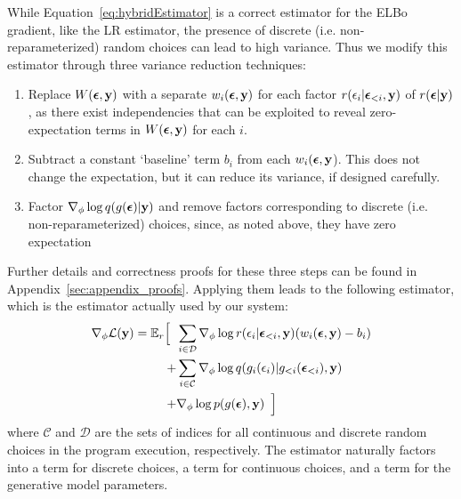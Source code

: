 While Equation~\ref{eq:hybridEstimator} is a correct estimator for the ELBo gradient, like the LR estimator, the presence of discrete (i.e. non-reparameterized) random choices can lead to high variance. Thus we modify this estimator through three variance reduction techniques:
\begin{enumerate}
\item{Replace $W(\bm{\epsilon}, \mathbf{y})$ with a separate $w_i(\bm{\epsilon}, \mathbf{y})$ for each factor $r(\epsilon_i | \bm{\epsilon}_{<i}, \mathbf{y})$ of $r(\bm{\epsilon} | \mathbf{y})$, as there exist independencies that can be exploited to reveal zero-expectation terms in $W(\bm{\epsilon}, \mathbf{y})$ for each $i$.}
\item{Subtract a constant `baseline' term $b_i$ from each $w_i(\bm{\epsilon}, \mathbf{y}$). This does not change the expectation, but it can reduce its variance, if designed carefully.}
\item{Factor $\nabla_\phi \log q(g(\bm{\epsilon}) | \mathbf{y})$ and remove factors corresponding to discrete (i.e. non-reparameterized) choices, since, as noted above, they have zero expectation}
\end{enumerate}
Further details and correctness proofs for these three steps can be found in Appendix~\ref{sec:appendix_proofs}. Applying them leads to the following estimator, which is the estimator actually used by our system:
\begin{align}
\begin{split}
\gradparams \elbo = \expect_\reparamDist \Bigl[ \hspace{0.5em}
&\sum_{i \in \mathcal{D}} \gradparams \log \reparamDist(\reparamVar_i | \reparamVars_{<i}, \observedVars) ( w_i(\reparamVars, \observedVars) - b_i ) \\
%
+ &\sum_{i \in \mathcal{C}} \gradparams \log \guide(\reparamXform_i(\reparamVar_i) | \reparamXform_{<i}(\reparamVars_{<i}), \observedVars) \\
%
+ &\gradparams \log p(\xformedVars, \observedVars) \hspace{0.5em} \Bigr]
\end{split}
\label{eq:finalEstimator}
\end{align}
where $\mathcal{C}$ and $\mathcal{D}$ are the sets of indices for all continuous and discrete random choices in the program execution, respectively.
The estimator naturally factors into a term for discrete choices, a term for continuous choices, and a term for the generative model parameters.

